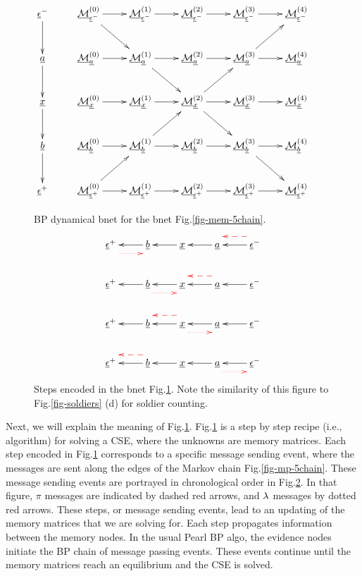 \begin{figure}
$$\xymatrix{
\rveps^-\ar[d]
&\ucalm^{(0)}_{\rveps^-}\ar[r]\ar[dr]
&\ucalm^{(1)}_{\rveps^-}\ar[r]
&\ucalm^{(2)}_{\rveps^-}\ar[r]
&\ucalm^{(3)}_{\rveps^-}\ar[r]
&\ucalm^{(4)}_{\rveps^-}
&
\\
\rva\ar[d]
&\ucalm^{(0)}_{\rva}\ar[r]
&\ucalm^{(1)}_{\rva}\ar[r]\ar[dr]
&\ucalm^{(2)}_{\rva}\ar[r]
&\ucalm^{(3)}_{\rva}\ar[r]\ar[ur]
&\ucalm^{(4)}_{\rva}
\\
\rvx\ar[d]
&\ucalm^{(0)}_{\rvx}\ar[r]
&\ucalm^{(1)}_{\rvx}\ar[r]
&\ucalm^{(2)}_{\rvx}\ar[r]\ar[dr]\ar[ur]
&\ucalm^{(3)}_{\rvx}\ar[r]
&\ucalm^{(4)}_{\rvx}
\\
\rvb\ar[d]
&\ucalm^{(0)}_{\rvb}\ar[r]
&\ucalm^{(1)}_{\rvb}\ar[r]\ar[ur]
&\ucalm^{(2)}_{\rvb}\ar[r]
&\ucalm^{(3)}_{\rvb}\ar[r]\ar[dr]
&\ucalm^{(4)}_{\rvb}
\\
\rveps^+
&\ucalm^{(0)}_{\rveps^+}\ar[r]\ar[ur]
&\ucalm^{(1)}_{\rveps^+}\ar[r]
&\ucalm^{(2)}_{\rveps^+}\ar[r]
&\ucalm^{(3)}_{\rveps^+}\ar[r]
&\ucalm^{(4)}_{\rveps^+}
}$$
\caption{BP dynamical bnet for the bnet
  Fig.\ref{fig-mem-5chain}.}
\label{fig-propagation-5chain}
\end{figure}

\begin{figure}[h!]
$$
\xymatrix{
\rveps^+\ar@[red]@{.>}@<-2ex>[r]
&\rvb\ar[l]
&\rvx\ar[l]
&\rva\ar[l]
&\rveps^-\ar[l]\ar@[red]@{-->}@<-2ex>[l]
\\
\rveps^+
&\rvb\ar[l]\ar@[red]@{.>}@<-2ex>[r]
&\rvx\ar[l]
&\rva\ar[l]\ar@[red]@{-->}@<-2ex>[l]
&\rveps^-\ar[l]
\\
\rveps^+
&\rvb\ar[l]
&\rvx\ar[l]\ar@[red]@{.>}@<-2ex>[r]
\ar@[red]@{-->}@<-2ex>[l]
&\rva\ar[l]
&\rveps^-\ar[l]
\\
\rveps^+
&\rvb\ar[l]\ar@[red]@{-->}@<-2ex>[l]
&\rvx\ar[l]
&\rva\ar[l]\ar@[red]@{.>}@<-2ex>[r]
&\rveps^-\ar[l]
}$$
\caption{
Steps encoded in the 
bnet 
Fig.\ref{fig-propagation-5chain}.
Note the 
similarity 
of this figure 
to Fig.\ref{fig-soldiers} (d)
for soldier counting.
} 
\label{fig-multiframe-5chain}
\end{figure}

Next, we will
explain the meaning
of Fig.\ref{fig-propagation-5chain}.
Fig.\ref{fig-propagation-5chain}
is a step by step
recipe (i.e., algorithm)
for solving a CSE,
where the unknowns are
memory matrices.
Each step
encoded in
Fig.\ref{fig-propagation-5chain}
corresponds to a
specific
message sending event,
where the messages
are sent
along the edges 
of the Markov chain
Fig.\ref{fig-mp-5chain}.
These message sending
events are portrayed in
chronological order
in Fig.\ref{fig-multiframe-5chain}.
In that figure,
$\pi$ messages
are indicated by
dashed red arrows,
and $\lambda$ messages
by dotted red arrows.  
These steps, or
message  sending events,
lead to an updating
of the memory matrices
that we are solving for.
Each step propagates information
between the memory nodes.
In the usual Pearl BP algo, 
the evidence nodes 
initiate the BP
chain of 
message passing events.
These events 
continue
until 
the 
memory 
matrices
reach an equilibrium
and the CSE is solved.


